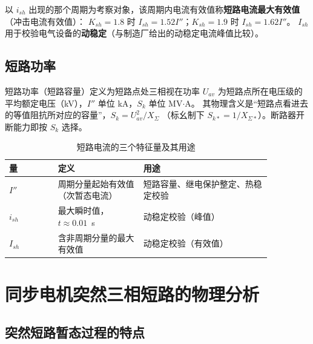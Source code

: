 以 $i_{sh}$ 出现的那个周期为考察对象，该周期内电流有效值称\textbf{短路电流最大有效值}
（冲击电流有效值）：
$K_{sh}=1.8$ 时 $I_{sh}=1.52I''$；$K_{sh}=1.9$ 时 $I_{sh}=1.62I''$。
$I_{sh}$ 用于校验电气设备的\textbf{动稳定}（与制造厂给出的动稳定电流峰值比较）。

\subsection{短路功率}

短路功率（短路容量）定义为短路点处三相视在功率
$U_{av}$ 为短路点所在电压级的平均额定电压（kV），$I''$ 单位 kA，$S_k$ 单位 MV$\cdot$A。
其物理含义是“短路点看进去的等值阻抗所对应的容量”，$S_k=U_{av}^{2}/X_{\Sigma}$
（标幺制下 $S_{k*}=1/X_{\Sigma*}$）。断路器开断能力即按 $S_k$ 选择。

\begin{table}[htbp]
  \centering
  \caption{短路电流的三个特征量及其用途}
  \small
  \begin{tabular}{@{}p{0.16\linewidth}p{0.28\linewidth}p{0.42\linewidth}@{}}
    \toprule
    量 & 定义 & 用途 \\
    \midrule
    $I''$ & 周期分量起始有效值（次暂态电流） & 短路容量、继电保护整定、热稳定校验 \\
    $i_{sh}$ & 最大瞬时值，$t\approx0.01$~s & 动稳定校验（峰值） \\
    $I_{sh}$ & 含非周期分量的最大有效值 & 动稳定校验（有效值） \\
    \bottomrule
  \end{tabular}
\end{table}


\section{同步电机突然三相短路的物理分析}

\subsection{突然短路暂态过程的特点}

